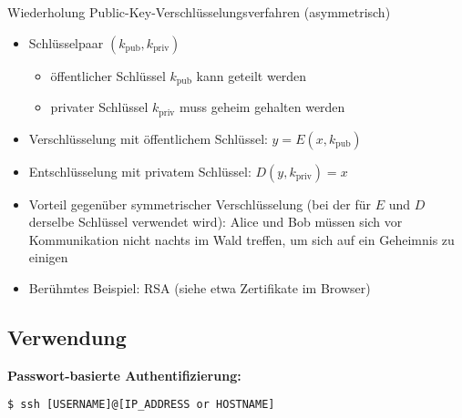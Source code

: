 Wiederholung Public-Key-Verschlüsselungsverfahren (asymmetrisch)
\begin{itemize}
	\item Schlüsselpaar $(k_\text{pub}, k_\text{priv})$
	      \begin{itemize}
		      \item öffentlicher Schlüssel $k_\text{pub}$ kann geteilt werden
		      \item privater Schlüssel $k_\text{priv}$ muss geheim gehalten werden
	      \end{itemize}
	\item Verschlüsselung mit öffentlichem Schlüssel: $y = E(x, k_\text{pub})$
	\item Entschlüsselung mit privatem Schlüssel: $D(y, k_\text{priv}) = x$
	\item Vorteil gegenüber symmetrischer Verschlüsselung (bei der für $E$ und $D$ derselbe Schlüssel verwendet wird): Alice und Bob müssen sich vor Kommunikation nicht nachts im Wald treffen, um sich auf ein Geheimnis zu einigen
	\item Berühmtes Beispiel: RSA (siehe etwa Zertifikate im Browser)
\end{itemize}
%
%
\subsection{Verwendung}
\textbf{Passwort-basierte Authentifizierung:}
\begin{verbatim}
$ ssh [USERNAME]@[IP_ADDRESS or HOSTNAME]
\end{verbatim}


